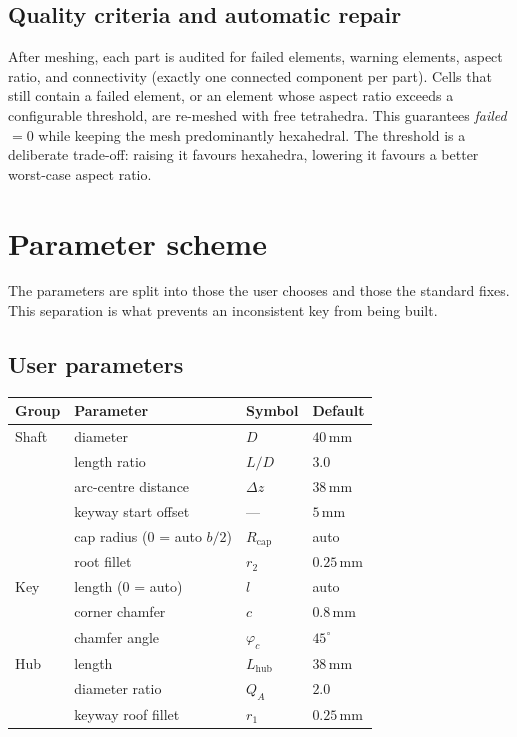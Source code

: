 \documentclass[11pt,a4paper]{article}
\newcommand{\unit}[1]{\,\mathrm{#1}}
\begin{document}
\subsection{Quality criteria and automatic repair}
After meshing, each part is audited for failed elements, warning elements,
aspect ratio, and connectivity (exactly one connected component per part). Cells
that still contain a failed element, or an element whose aspect ratio exceeds a
configurable threshold, are re-meshed with free tetrahedra. This guarantees
\emph{failed} $= 0$ while keeping the mesh predominantly hexahedral. The
threshold is a deliberate trade-off: raising it favours hexahedra, lowering it
favours a better worst-case aspect ratio.

\section{Parameter scheme}
\label{sec:param}
The parameters are split into those the user chooses and those the standard
fixes. This separation is what prevents an inconsistent key from being built.

\subsection{User parameters}
\begin{center}
\begin{tabular}{llll}
\toprule
Group & Parameter & Symbol & Default \\
\midrule
Shaft & diameter & $D$ & $40\unit{mm}$ \\
      & length ratio & $L/D$ & $3.0$ \\
      & arc-centre distance & $\Delta z$ & $38\unit{mm}$ \\
      & keyway start offset & --- & $5\unit{mm}$ \\
      & cap radius (0 = auto $b/2$) & $R_{\text{cap}}$ & auto \\
      & root fillet & $r_2$ & $0.25\unit{mm}$ \\
Key   & length (0 = auto) & $l$ & auto \\
      & corner chamfer & $c$ & $0.8\unit{mm}$ \\
      & chamfer angle & $\varphi_c$ & $45^\circ$ \\
Hub   & length & $L_{\text{hub}}$ & $38\unit{mm}$ \\
      & diameter ratio & $Q_A$ & $2.0$ \\
      & keyway roof fillet & $r_1$ & $0.25\unit{mm}$ \\
\bottomrule
\end{tabular}
\end{center}
\end{document}
